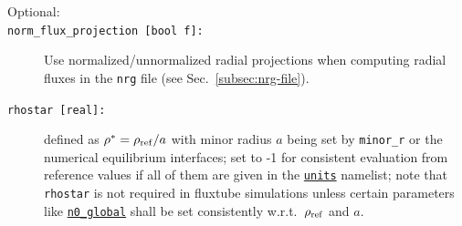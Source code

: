 \documentclass[12pt]{article}
\begin{document}
\begin{description}
\item[Optional:]

\item[\hypertarget{norm_flux_projection}{\tt norm\_flux\_projection [bool f]:}] Use normalized/unnormalized radial projections 
when computing radial fluxes in the {\tt nrg} file (see Sec.~\ref{subsec:nrg-file}).

\item[\hypertarget{rhostar}{\tt rhostar [real]:}] defined as $\rho^* = \rho_{\rm ref}/a$ with minor radius $a$ being set by {\tt minor\_r} 
or the numerical equilibrium interfaces; set to -1 for consistent evaluation from reference values if all of them are given 
in the \hyperlink{units_nml}{\tt units} namelist; note that {\tt rhostar} is not required in fluxtube simulations unless certain 
parameters like \hyperlink{n0\_global}{\tt n0\_global} shall be set consistently w.r.t.~$\rho_{\rm ref}$ and $a$.\\

\end{description}
\end{document}
